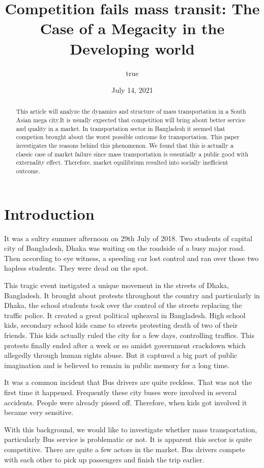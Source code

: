 \documentclass[
  11pt,
]{article}
\title{Competition fails mass transit: The Case of a Megacity in the
Developing world}
\author{true}
\date{July 14, 2021}
\begin{document}
\maketitle
\begin{abstract}
This article will analyze the dynamics and structure of mass
transportation in a South Asian mega city.It is usually expected that
competition will bring about better service and quality in a market. In
transportation sector in Bangladesh it seemed that competion brought
about the worst possible outcome for transportation. This paper
investigates the reasons behind this phenomenon. We found that this is
actually a classic case of market failure since mass transportation is
essentially a public good with externality effect. Therefore, market
equilibrium resulted into socially inefficient outcome.
\end{abstract}

\hypertarget{introduction}{%
\section{Introduction}\label{introduction}}

It was a sultry summer afternoon on 29th July of 2018. Two students of
capital city of Bangladesh, Dhaka was waiting on the roadside of a busy
major road. Then according to eye witness, a speeding car lost control
and ran over those two hapless students. They were dead on the spot.

This tragic event instigated a unique movement in the streets of Dhaka,
Bangladesh. It brought about protests throughout the country and
particularly in Dhaka, the school students took over the control of the
streets replacing the traffic police. It created a great political
upheaval in Bangladesh. High school kids, secondary school kids came to
streets protesting death of two of their friends. This kids actually
ruled the city for a few days, controlling traffics. This protests
finally ended after a week or so amidst government crackdown which
allegedly through human rights abuse. But it captured a big part of
public imagination and is believed to remain in public memory for a long
time.

It was a common incident that Bus drivers are quite reckless. That was
not the first time it happened. Frequently these city buses were
involved in several accidents. People were already pissed off.
Therefore, when kids got involved it became very sensitive.

With this background, we would like to investigate whether mass
transportation, particularly Bus service is problematic or not. It is
apparent this sector is quite competitive. There are quite a few actors
in the market. Bus drivers compete with each other to pick up passengers
and finish the trip earlier.
\end{document}
